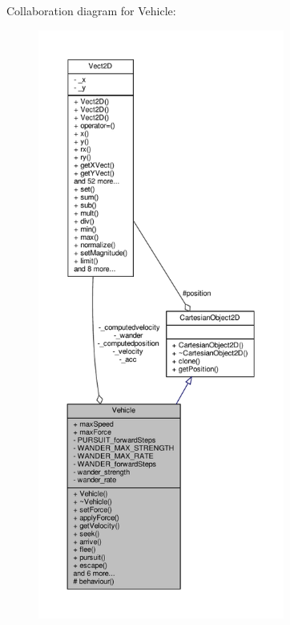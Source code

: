 Collaboration diagram for Vehicle\+:\nopagebreak
\begin{figure}[H]
\begin{center}
\leavevmode
\includegraphics[height=550pt]{classVehicle__coll__graph}
\end{center}
\end{figure}
